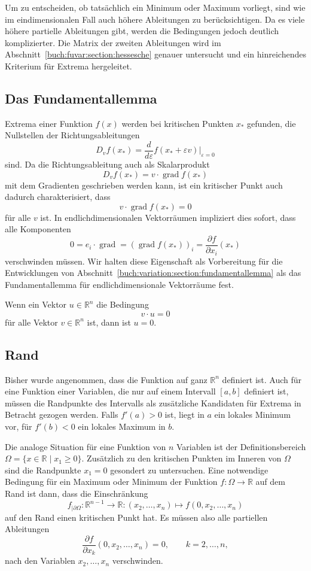 Um zu entscheiden, ob tatsächlich ein Minimum oder Maximum vorliegt,
sind wie im eindimensionalen Fall auch höhere Ableitungen zu berücksichtigen.
Da es viele höhere partielle Ableitungen gibt, werden die Bedingungen
jedoch deutlich komplizierter.
Die Matrix der zweiten Ableitungen wird im
Abschnitt~\ref{buch:fuvar:section:hessesche} genauer untersucht 
und ein hinreichendes Kriterium für Extrema hergeleitet.

%
%
\subsection{Das Fundamentallemma
\label{buch:fuvar:subsection:fundamentallemma}}
Extrema einer Funktion $f(x)$ werden bei kritischen Punkten $x_*$
gefunden, die Nullstellen der Richtungsableitungen
\[
D_vf(x_*)
=
\frac{d}{d\varepsilon}
f(x_*+\varepsilon v)
\bigg|_{\varepsilon =0}
\]
sind.
Da die Richtungsableitung auch als Skalarprodukt
\[
D_vf(x_*)
=
v
\cdot 
\operatorname{grad}f(x_*)
\]
mit dem Gradienten geschrieben werden kann, ist ein kritischer
Punkt auch dadurch charakterisiert, dass
\[
v\cdot \operatorname{grad}f(x_*)
=
0
\]
für alle $v$ ist.
In endlichdimensionalen Vektorräumen impliziert dies sofort,
dass alle Komponenten
\[
0
=
e_i\cdot \operatorname{grad}
=
(\operatorname{grad}f(x_*))_i
=
\frac{\partial f}{\partial x_i}(x_*)
\]
verschwinden müssen.
Wir halten diese Eigenschaft als Vorbereitung für die Entwicklungen
von Abschnitt~\ref{buch:variation:section:fundamentallemma}
als das Fundamentallemma für endlichdimensionale Vektorräume
fest.

\begin{satz}
Wenn ein Vektor $u\in \mathbb{R}^n$ die Bedingung
\[
v \cdot u=0
\]
für alle Vektor $v\in\mathbb{R}^n$ ist, dann ist $u=0$.
\end{satz}

%
%
\subsection{Rand}
Bisher wurde angenommen, dass die Funktion auf ganz $\mathbb{R}^n$
definiert ist.
Auch für eine Funktion einer Variablen, die nur auf einem Intervall
$[a,b]$ definiert ist, müssen die Randpunkte des Intervalls als
zusätzliche Kandidaten für Extrema in Betracht gezogen werden.
Falls $f'(a)>0$ ist, liegt in $a$ ein lokales Minimum vor, für
$f'(b)<0$ ein lokales Maximum in $b$.

Die analoge Situation für eine Funktion von $n$ Variablen ist der
Definitionsbereich $\Omega=\{x\in \mathbb{R}\mid x_1\ge 0\}$.
Zusätzlich zu den kritischen Punkten im Inneren von $\Omega$ sind die
Randpunkte $x_1=0$ gesondert zu untersuchen.
Eine notwendige Bedingung für ein Maximum oder Minimum der Funktion
$f\colon \Omega\to\mathbb{R}$ auf dem Rand ist dann, dass die Einschränkung
\[
f_{|\partial \Omega}
\colon
\mathbb{R}^{n-1}\to \mathbb{R}
:
(x_2,\dots,x_n)\mapsto f(0,x_2,\dots,x_n)
\]
auf den Rand einen kritischen Punkt hat.
Es müssen also alle partiellen Ableitungen
\[
\frac{\partial f}{\partial x_k}(0,x_2,\dots,x_n)
=
0,\qquad k=2,\dots,n,
\]
nach den Variablen
$x_2,\dots,x_n$ verschwinden.

